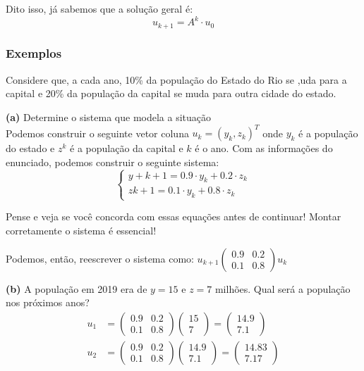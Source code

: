 \documentclass[12pt]{article}
\begin{document}
Dito isso, já sabemos que a solução geral é:
\begin{equation*}
	u_{k+1}=A^k\cdot u_0
\end{equation*}

\subsubsection{Exemplos}
Considere que, a cada ano, 10\% da população do Estado do Rio se ,uda para a capital e 20\% da população da capital se muda para outra cidade do estado.

\textbf{(a)} Determine o sistema que modela a situação\\

Podemos construir o seguinte vetor coluna $u_k=(y_k,z_k)^T$ onde $y_k$ é a população do estado e $z^k$ é a população da capital e $k$ é o ano. Com as informações do enunciado, podemos construir o seguinte sistema:
\begin{equation*}
	\begin{cases}
		y+{k+1}=0.9\cdot y_k+0.2\cdot z_k\\
		z{k+1}=0.1\cdot y_k+0.8\cdot z_k
	\end{cases}
\end{equation*}

Pense e veja se você concorda com essas equações antes de continuar! Montar corretamente o sistema é essencial!

Podemos, então, reescrever o sistema como:
$u_{k+1}\begin{pmatrix}
	0.9 & 0.2 \\
	0.1 & 0.8
\end{pmatrix}u_k$

\textbf{(b)} A população em 2019 era de $y=15$ e $z=7$ milhões. Qual será a população nos próximos anos?\\

\begin{align*}
	u_1&=\begin{pmatrix}
		0.9 & 0.2 \\
		0.1 & 0.8
	\end{pmatrix}\begin{pmatrix}
		15 \\
		7
	\end{pmatrix}=
	\begin{pmatrix}
		14.9 \\
		7.1
	\end{pmatrix}\\
	u_2&=\begin{pmatrix}
		0.9 & 0.2 \\
		0.1 & 0.8
	\end{pmatrix}\begin{pmatrix}
		14.9 \\
		7.1
	\end{pmatrix}=
	\begin{pmatrix}
		14.83 \\
		7.17
	\end{pmatrix}
\end{align*}
\end{document}
